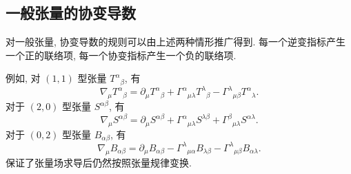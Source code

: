 \subsection{一般张量的协变导数}

对一般张量, 协变导数的规则可以由上述两种情形推广得到. 每一个逆变指标产生一个正的联络项, 每一个协变指标产生一个负的联络项. 

例如, 对 $(1,1)$ 型张量 $T^{\alpha}{}_{\beta}$, 有
\begin{equation}
	\nabla_{\mu}T^{\alpha}{}_{\beta}
	=
	\partial_{\mu}T^{\alpha}{}_{\beta}
	+
	\Gamma^{\alpha}{}_{\mu\lambda}T^{\lambda}{}_{\beta}
	-
	\Gamma^{\lambda}{}_{\mu\beta}T^{\alpha}{}_{\lambda}.
	\label{eq:2.9}
\end{equation}
对于 $(2,0)$ 型张量 $S^{\alpha\beta}$, 有
\[
\nabla_{\mu}S^{\alpha\beta}
=
\partial_{\mu}S^{\alpha\beta}
+
\Gamma^{\alpha}{}_{\mu\lambda}S^{\lambda\beta}
+
\Gamma^{\beta}{}_{\mu\lambda}S^{\alpha\lambda}.
\]
对于 $(0,2)$ 型张量 $B_{\alpha\beta}$, 有
\[
\nabla_{\mu}B_{\alpha\beta}
=
\partial_{\mu}B_{\alpha\beta}
-
\Gamma^{\lambda}{}_{\mu\alpha}B_{\lambda\beta}
-
\Gamma^{\lambda}{}_{\mu\beta}B_{\alpha\lambda}.
\]
保证了张量场求导后仍然按照张量规律变换. 

